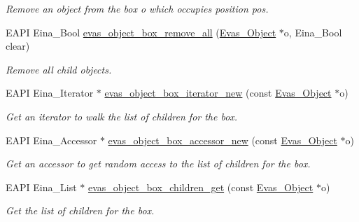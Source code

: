 \begin{DoxyCompactItemize}
\begin{DoxyCompactList}\small\item\em Remove an object from the box {\itshape o\/} which occupies position {\itshape pos\/}. \item\end{DoxyCompactList}\item 
EAPI Eina\_\-Bool \hyperlink{group__Evas__Object__Box_ga6c114f237f66c0208f0669783f671318}{evas\_\-object\_\-box\_\-remove\_\-all} (\hyperlink{group__Evas__Object__Group_ga9e19e6dd1f517a0ba437c0114d3e7c97}{Evas\_\-Object} $\ast$o, Eina\_\-Bool clear)
\begin{DoxyCompactList}\small\item\em Remove all child objects. \item\end{DoxyCompactList}\item 
EAPI Eina\_\-Iterator $\ast$ \hyperlink{group__Evas__Object__Box_ga2a3ceff4f02512fa7f85618252eacbdc}{evas\_\-object\_\-box\_\-iterator\_\-new} (const \hyperlink{group__Evas__Object__Group_ga9e19e6dd1f517a0ba437c0114d3e7c97}{Evas\_\-Object} $\ast$o)
\begin{DoxyCompactList}\small\item\em Get an iterator to walk the list of children for the box. \item\end{DoxyCompactList}\item 
EAPI Eina\_\-Accessor $\ast$ \hyperlink{group__Evas__Object__Box_gad5c5837393bd163f6cde72bde073333b}{evas\_\-object\_\-box\_\-accessor\_\-new} (const \hyperlink{group__Evas__Object__Group_ga9e19e6dd1f517a0ba437c0114d3e7c97}{Evas\_\-Object} $\ast$o)
\begin{DoxyCompactList}\small\item\em Get an accessor to get random access to the list of children for the box. \item\end{DoxyCompactList}\item 
EAPI Eina\_\-List $\ast$ \hyperlink{group__Evas__Object__Box_ga542294a74645829cd5531a8ddec32d9c}{evas\_\-object\_\-box\_\-children\_\-get} (const \hyperlink{group__Evas__Object__Group_ga9e19e6dd1f517a0ba437c0114d3e7c97}{Evas\_\-Object} $\ast$o)
\begin{DoxyCompactList}\small\item\em Get the list of children for the box. \item\end{DoxyCompactList}\item 

\end{DoxyCompactItemize}
